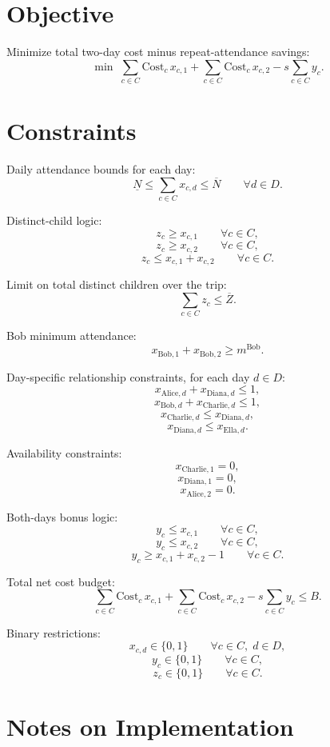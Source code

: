 \section*{Objective}

Minimize total two-day cost minus repeat-attendance savings:
\[
\min \;
\sum_{c \in C} \mathrm{Cost}_c \, x_{c,1}
+
\sum_{c \in C} \mathrm{Cost}_c \, x_{c,2}
-
s \sum_{c \in C} y_c.
\]

\section*{Constraints}

Daily attendance bounds for each day:
\[
\underline{N} \le \sum_{c \in C} x_{c,d} \le \overline{N}
\qquad \forall d \in D.
\]

Distinct-child logic:
\[
z_c \ge x_{c,1} \qquad \forall c \in C,
\]
\[
z_c \ge x_{c,2} \qquad \forall c \in C,
\]
\[
z_c \le x_{c,1}+x_{c,2} \qquad \forall c \in C.
\]

Limit on total distinct children over the trip:
\[
\sum_{c \in C} z_c \le \overline{Z}.
\]

Bob minimum attendance:
\[
x_{\text{Bob},1}+x_{\text{Bob},2} \ge m^{\text{Bob}}.
\]

Day-specific relationship constraints, for each day $d \in D$:
\[
x_{\text{Alice},d}+x_{\text{Diana},d} \le 1,
\]
\[
x_{\text{Bob},d}+x_{\text{Charlie},d} \le 1,
\]
\[
x_{\text{Charlie},d} \le x_{\text{Diana},d},
\]
\[
x_{\text{Diana},d} \le x_{\text{Ella},d}.
\]

Availability constraints:
\[
x_{\text{Charlie},1}=0,
\]
\[
x_{\text{Diana},1}=0,
\]
\[
x_{\text{Alice},2}=0.
\]

Both-days bonus logic:
\[
y_c \le x_{c,1} \qquad \forall c \in C,
\]
\[
y_c \le x_{c,2} \qquad \forall c \in C,
\]
\[
y_c \ge x_{c,1}+x_{c,2}-1 \qquad \forall c \in C.
\]

Total net cost budget:
\[
\sum_{c \in C} \mathrm{Cost}_c \, x_{c,1}
+
\sum_{c \in C} \mathrm{Cost}_c \, x_{c,2}
-
s \sum_{c \in C} y_c
\le B.
\]

Binary restrictions:
\[
x_{c,d} \in \{0,1\} \qquad \forall c \in C,\; d \in D,
\]
\[
y_c \in \{0,1\} \qquad \forall c \in C,
\]
\[
z_c \in \{0,1\} \qquad \forall c \in C.
\]

\section*{Notes on Implementation}

